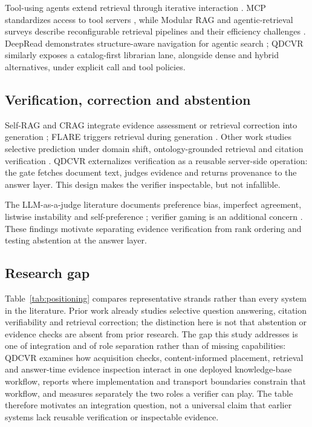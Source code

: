 Tool-using agents extend retrieval through iterative interaction
\citep{react-yao,toolformer}. MCP standardizes access to tool servers
\citep{mcp}, while Modular RAG and agentic-retrieval surveys describe
reconfigurable retrieval pipelines and their efficiency challenges
\citep{modular-rag,singh-agentic-rag}. DeepRead demonstrates structure-aware
navigation for agentic search \citep{deepread}; QDCVR similarly exposes a
catalog-first librarian lane, alongside dense and hybrid alternatives, under
explicit call and tool policies.

\subsection{Verification, correction and abstention}
Self-RAG and CRAG integrate evidence assessment or retrieval correction into
generation \citep{selfrag,crag}; FLARE triggers retrieval during generation
\citep{flare}. Other work studies selective prediction under domain shift,
ontology-grounded retrieval and citation verification
\citep{kamath,cyberbot,liu-verifiability,gao-citations}. QDCVR externalizes
verification as a reusable server-side operation: the gate fetches document
text, judges evidence and returns provenance to the answer layer. This design
makes the verifier inspectable, but not infallible.

The LLM-as-a-judge literature documents preference bias, imperfect agreement,
listwise instability and self-preference \citep{zheng-llmjudge,sun-urara,panickssery-selfpref}; verifier gaming is an additional concern
\citep{lightman-verify}. These findings motivate separating evidence
verification from rank ordering and testing abstention at the answer layer.

\subsection{Research gap}
\label{sec:gap}

Table~\ref{tab:positioning} compares representative strands rather than every
system in the literature. Prior work already studies selective question
answering, citation verifiability and retrieval correction; the distinction
here is not that abstention or evidence checks are absent from prior research.
The gap this study addresses is one of integration and of role separation
rather than of missing capabilities: QDCVR examines how acquisition checks,
content-informed placement, retrieval and answer-time evidence inspection
interact in one deployed knowledge-base workflow, reports where implementation
and transport boundaries constrain that workflow, and measures separately the
two roles a verifier can play. The table therefore motivates an
integration question, not a universal claim that earlier systems lack reusable
verification or inspectable evidence.

